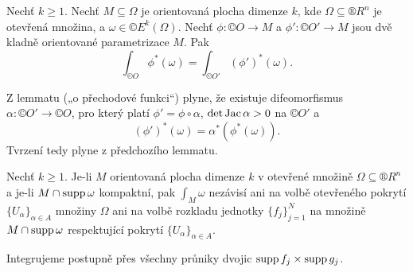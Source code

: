 \documentclass[12pt]{article}                   %
\begin{document}
        \begin{lemma}
            Nechť $k ≥ 1$. Nechť $M \subseteq \Omega$ je orientovaná plocha dimenze $k$, kde $\Omega \subseteq ®R^n$ je otevřená množina, a $\omega \in ©E^k(\Omega)$. Nechť $\phi: ©O \rightarrow M$ a $\phi': ©O' \rightarrow M$ jsou dvě kladně orientované parametrizace $M$. Pak
            $$ \int_{©O} \phi^*(\omega) = \int_{©O'} (\phi')^*(\omega). $$

            \begin{dukazin}
                Z lemmatu („o přechodové funkci“) plyne, že existuje difeomorfismus $\alpha: ©O' \rightarrow ©O$, pro který platí $\phi' = \phi \circ \alpha$, $\det \operatorname{Jac} \alpha > 0$ na $©O'$ a
                $$ (\phi')^*(\omega) = \alpha^*(\phi^*(\omega)). $$ 
                Tvrzení tedy plyne z předchozího lemmatu.
            \end{dukazin}
        \end{lemma}

        \begin{lemma}
            Nechť $k ≥ 1$. Je-li $M$ orientovaná plocha dimenze $k$ v otevřené množině $\Omega \subseteq ®R^n$ a je-li $M \cap \operatorname{supp} \omega$ kompaktní, pak $\int_M \omega$ nezávisí ani na volbě otevřeného pokrytí $\{U_\alpha\}_{\alpha \in A}$ množiny $\Omega$ ani na volbě rozkladu jednotky $\{f_j\}_{j=1}^N$ na množině $M \cap \operatorname{supp} \omega$ respektující pokrytí $\{U_\alpha\}_{\alpha \in A}$.

            \begin{dukazin}
                Integrujeme postupně přes všechny průniky dvojic $\operatorname{supp} f_j \times \operatorname{supp} g_j$.
            \end{dukazin}
        \end{lemma}
\end{document}
